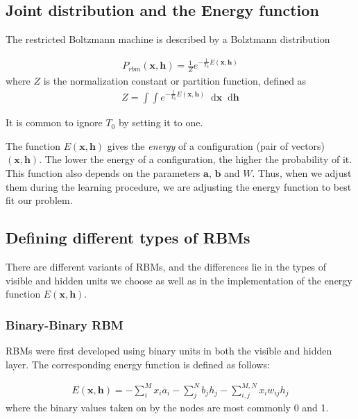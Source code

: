 \documentclass[norsk,a4paper,11pt]{article}
\newcommand*\diff{\mathop{}\!\mathrm{d}}
\newcommand{\Vx}{\mathbf{x}}
\newcommand{\Vh}{\mathbf{h}}
\newcommand{\Va}{\mathbf{a}}
\newcommand{\Vb}{\mathbf{b}}
\begin{document}
\subsection{Joint distribution and the Energy function}
The restricted Boltzmann machine is described by a Bolztmann distribution

\begin{align}
	P_{rbm}(\Vx,\mathbf{h}) = \frac{1}{Z} e^{-\frac{1}{T_0}E(\Vx,\mathbf{h})}
\end{align}
where $Z$ is the normalization constant or partition function, defined as 
\begin{align}
	Z = \int \int e^{-\frac{1}{T_0}E(\Vx,\mathbf{h})} \diff \Vx \diff \mathbf{h}
\end{align}

It is common to ignore $T_0$ by setting it to one. 

The function $E(\Vx,\mathbf{h})$ gives the \textit{energy} of a configuration (pair of vectors) $(\Vx, \Vh)$. The lower the energy of a configuration, the higher the probability of it. This function also depends on the parameters $\Va$, $\Vb$ and $W$. Thus, when we adjust them during the learning procedure, we are adjusting the energy function to best fit our problem.

\subsection{Defining different types of RBMs}
There are different variants of RBMs, and the differences lie in the types of visible and hidden units we choose as well as in the implementation of the energy function $E(\Vx,\mathbf{h})$. 

\subsubsection{Binary-Binary RBM}
RBMs were first developed using binary units in both the visible and hidden layer. The corresponding energy function is defined as follows:

\begin{align}
	E(\Vx, \mathbf{h}) = - \sum_i^M x_i a_i- \sum_j^N b_j h_j - \sum_{i,j}^{M,N} x_i w_{ij} h_j
\end{align}
where the binary values taken on by the nodes are most commonly 0 and 1.
\end{document}
